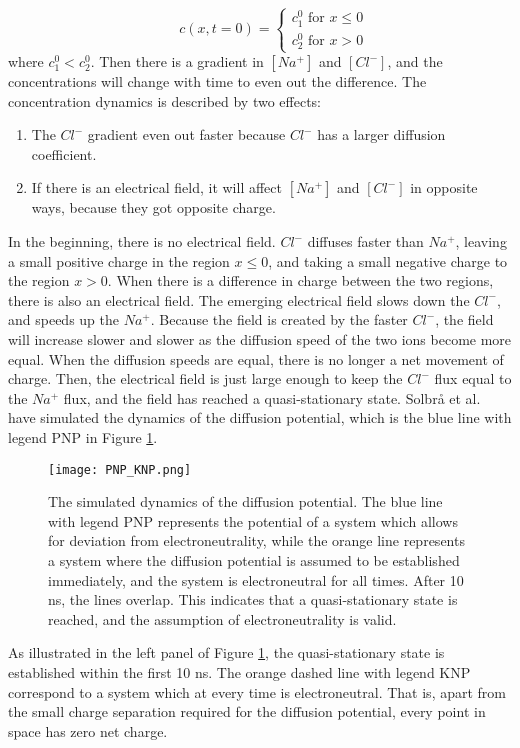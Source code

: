 \documentclass{article}
\begin{document}
\begin{equation}
 \qquad c\left(x,t=0\right) = \begin{cases}
  c_1^0 \text{ for } x \leq 0 \\
  c_2^0 \text{ for } x>0 
  \end{cases}
  \label{eq:step_function }
\end{equation}
where $c_1^0<c_2^0$. Then there is a gradient in $[Na^+]$ and $[Cl^-]$, and the concentrations will change with time to even out the difference. The concentration dynamics is described by two effects:
\begin{enumerate}
\item The $Cl^-$ gradient even out faster because $Cl^-$ has a larger diffusion coefficient. 
\item If there is an electrical field, it will affect  $[Na^+]$ and $[Cl^-]$ in opposite ways, because they got opposite charge.
\end{enumerate}
In the beginning, there is no electrical field. $Cl^-$ diffuses faster than $Na^+$, leaving a small positive charge in the region $x\leq 0$, and taking a small negative charge to the region $x>0$. When there is a difference in charge between the two regions, there is also an electrical field. The emerging electrical field slows down the $Cl^-$, and speeds up the $Na^+$. Because the field is created by the faster $Cl^-$, the field will increase slower and slower as the diffusion speed of the two ions become more equal. When the diffusion speeds are equal, there is no longer a net movement of charge. Then, the electrical field is just large enough to keep the $Cl^-$ flux equal to the $Na^+$ flux, and the field has reached a quasi-stationary state.  Solbr{\aa} et al.\cite{Solbraa} have simulated the dynamics of the diffusion potential, which is the blue line with legend PNP in Figure \ref{fig:PNP_KNP}.  

\begin{figure}
  \texttt{[image: PNP\_KNP.png]}
  \caption{The simulated dynamics of the diffusion potential. The blue line with legend PNP represents the potential of a system which allows for deviation from electroneutrality, while the orange line represents a system where the diffusion potential is assumed to be established immediately, and the system is electroneutral for all times. After 10 ns, the lines overlap. This indicates that a quasi-stationary state is reached, and the assumption of electroneutrality is valid\cite{Solbraa}.}
  \label{fig:PNP_KNP}
\end{figure}
As illustrated in the left panel of Figure \ref{fig:PNP_KNP}, the quasi-stationary state is established within the first 10 ns. The orange dashed line with legend KNP correspond to a system which at every time is electroneutral. That is, apart from the small charge separation required for the diffusion potential, every point in space has zero net charge. 
\end{document}
